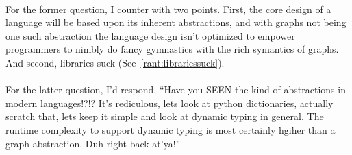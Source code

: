 \documentclass{book}
\begin{document}
\paragraph{}
For the former question, I counter with two points. First, the core design of a language will be based upon its inherent abstractions, and with graphs not being one such abstraction the language design isn't optimized to empower programmers to nimbly do fancy gymnastics with the rich symantics of graphs. And second, libraries suck (See~\ref{rant:librariessuck}).
\paragraph{}
For the latter question, I'd respond, ``Have you SEEN the kind of abstractions in modern languages!?!? It's rediculous, lets look at python dictionaries, actually scratch that, lets keep it simple and look at dynamic typing in general. The runtime complexity to support dynamic typing is most certainly hgiher than a graph abstraction. Duh right back at'ya!''
\end{document}
